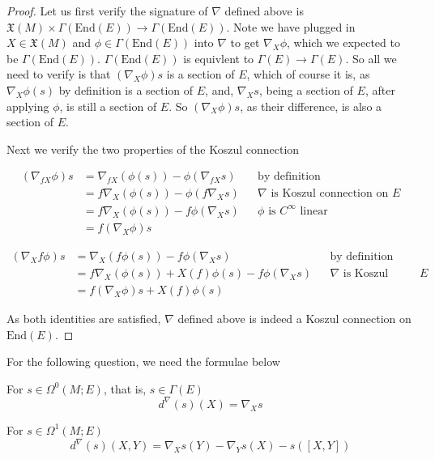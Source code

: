 \documentclass{article}
\theoremstyle{definition}
\theoremstyle{definition}
\theoremstyle{remark}
\newcommand{\X}{\mathfrak{X}}
\newcommand{\n}{\nabla}
\newcommand{\G}{\Gamma}
\newcommand{\End}{\text{End}}
\newcommand{\C}{C^{\infty}}
\renewcommand{\d}{d^{\nabla}}
\renewcommand{\n}{\nabla}
\begin{document}
\begin{proof}
	Let us first verify the signature of $\nabla$ defined above is $\X(M) \times \G(\End(E)) \rightarrow \G(\End(E))$.
	Note we have plugged in $X \in \X(M)$ and $\phi \in \G(\End(E))$ into $\nabla$ to get $\nabla_X \phi$, which we expected to be $\G(\End(E))$. 
	$\G(\End(E))$ is equivlent to $\G(E) \rightarrow \G(E)$. 
	So all we need to verify is that 	
	$(\nabla_{X}\phi)s$ is a section of $E$, which of course it is, as $\nabla_X \phi(s)$ by definition is a section of $E$, and, $\nabla_X s$, being a section of $E$, after applying $\phi$, is still a section of $E$. 
	So $(\n_X \phi) s$, as their difference, is also a section of $E$.

	Next we verify the two properties of the Koszul connection

	\begin{align*}
		(\nabla_{fX}\phi) s 
		&= \nabla_{fX} (\phi(s)) - \phi(\nabla_{fX}s)  && \text{by definition} \\ 
		&= f\nabla_{X} (\phi(s)) - \phi(f\nabla_{X}s)  && \nabla \text{ is Koszul connection on }E \\ 
		&= f\nabla_{X} (\phi(s)) - f\phi(\nabla_{X}s)  && \phi \text{ is } \C \text{ linear} \\ 
		&= f(\nabla_{X}\phi) s 
	\end{align*}

	\begin{align*}
		(\nabla_{X}f\phi) s 
		&= \nabla_{X} (f\phi(s)) - f\phi(\nabla_{X}s)  && \text{by definition} \\ 
		&= f\nabla_{X}(\phi(s)) + X(f)\phi(s) - f\phi(\nabla_{X}s)  && \nabla \text{ is Koszul connection on }E \\ 
		&= f(\nabla_{X}\phi) s  + X(f)\phi(s)
	\end{align*}

	As both identities are satisfied, $\nabla$ defined above is indeed a Koszul connection on $\End(E)$.
\end{proof}

For the following question, we need the formulae below

For $s \in \Omega^0(M; E)$, that is, $s\in \G(E)$
\begin{equation}
	\label{d0}
	\d(s)(X) = \nabla_X s 
\end{equation}

For $s \in \Omega^1(M; E)$
\begin{equation}
	\label{d1}
	\d(s)(X, Y) = \nabla_X s(Y) - \nabla_Y s(X) - s([X, Y])
\end{equation}
\end{document}
